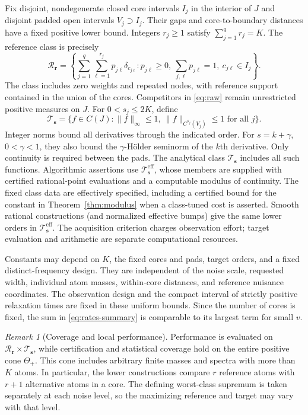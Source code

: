 \documentclass[10pt]{amsart}
\theoremstyle{definition}
\theoremstyle{remark}
\newtheorem{remark}[theorem]{Remark}
\theoremstyle{plain}
\newcommand{\ThetaAll}{\Theta_+}
\newcommand{\Tclass}{\mathcal T_{\boldsymbol s}}
\newcommand{\Teff}{\mathcal T_{\boldsymbol s}^{\mathrm{eff}}}
\newcommand{\Rclass}{\mathcal R_{\boldsymbol r}}
\begin{document}
Fix disjoint, nondegenerate closed core intervals $I_j$ in the interior of $J$ and disjoint padded open intervals $V_j\supset I_j$. Their gaps and core-to-boundary distances have a fixed positive lower bound. Integers $r_j\ge1$ satisfy $\sum_{j=1}^qr_j=K$. The reference class is precisely
\[
 \Rclass=\left\{\sum_{j=1}^q\sum_{\ell=1}^{r_j}p_{j\ell}\delta_{c_{j\ell}}:
 p_{j\ell}\ge0,\ \sum_{j,\ell}p_{j\ell}=1,\ c_{j\ell}\in I_j\right\}.
\]
The class includes zero weights and repeated nodes, with reference support contained in the union of the cores. Competitors in \eqref{eq:raw} remain unrestricted positive measures on $J$. For $0<s_j\le2K$, define
\begin{equation}\label{eq:targets}
 \Tclass=\{f\in C(J):\|f\|_\infty\le1,\ 
          \|f\|_{C^{s_j}(V_j)}\le1\text{ for all }j\}.
\end{equation}
Integer norms bound all derivatives through the indicated order. For $s=k+\gamma$, $0<\gamma<1$, they also bound the $\gamma$-H\"older seminorm of the $k$th derivative. Only continuity is required between the pads. The analytical class $\Tclass$ includes all such functions. Algorithmic assertions use $\Teff$, whose members are supplied with certified rational-point evaluations and a computable modulus of continuity. The fixed class data are effectively specified, including a certified bound for the constant in Theorem~\ref{thm:modulus} when a class-tuned cost is asserted. Smooth rational constructions (and normalized effective bumps) give the same lower orders in $\Teff$. The acquisition criterion charges observation effort; target evaluation and arithmetic are separate computational resources.

Constants may depend on $K$, the fixed cores and pads, target orders, and a fixed distinct-frequency design. They are independent of the noise scale, requested width, individual atom masses, within-core distances, and reference nuisance coordinates. The observation design and the compact interval of strictly positive relaxation times are fixed in these uniform bounds. Since the number of cores is fixed, the sum in \eqref{eq:rates-summary} is comparable to its largest term for small $v$.

\begin{remark}[Coverage and local performance]\label{rem:coverage}
Performance is evaluated on $\Rclass\times\Tclass$, while certification and statistical coverage hold on the entire positive cone $\ThetaAll$. This cone includes arbitrary finite masses and spectra with more than $K$ atoms. In particular, the lower constructions compare $r$ reference atoms with $r+1$ alternative atoms in a core. The defining worst-class supremum is taken separately at each noise level, so the maximizing reference and target may vary with that level.
\end{remark}
\end{document}
